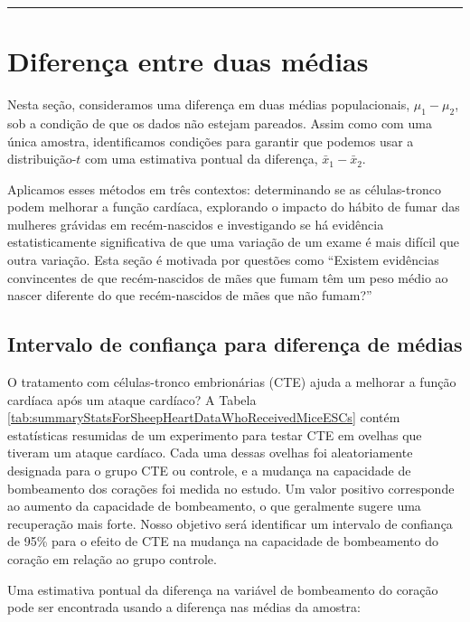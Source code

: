 \documentclass[
]{book}
\theoremstyle{definition}
\theoremstyle{definition}
\theoremstyle{definition}
\theoremstyle{definition}
\theoremstyle{remark}
\begin{document}
\begin{center}\rule{0.5\linewidth}{0.5pt}\end{center}

\hypertarget{differenceTwoMeans}{%
\section{Diferença entre duas médias}\label{differenceTwoMeans}}

Nesta seção, consideramos uma diferença em duas médias populacionais, \(\mu_1 - \mu_2\), sob a condição de que os dados não estejam pareados. Assim como com uma única amostra, identificamos condições para garantir que podemos usar a distribuição-\(t\) com uma estimativa pontual da diferença, \(\bar{x}_1 - \bar{x}_2\).

Aplicamos esses métodos em três contextos: determinando se as células-tronco podem melhorar a função cardíaca, explorando o impacto do hábito de fumar das mulheres grávidas em recém-nascidos e investigando se há evidência estatisticamente significativa de que uma variação de um exame é mais difícil que outra variação. Esta seção é motivada por questões como ``Existem evidências convincentes de que recém-nascidos de mães que fumam têm um peso médio ao nascer diferente do que recém-nascidos de mães que não fumam?''

\hypertarget{confidenceIntervalsMeanDifference}{%
\subsection{Intervalo de confiança para diferença de médias}\label{confidenceIntervalsMeanDifference}}

O tratamento com células-tronco embrionárias (CTE) ajuda a melhorar a função cardíaca após um ataque cardíaco? A Tabela \ref{tab:summaryStatsForSheepHeartDataWhoReceivedMiceESCs} contém estatísticas resumidas de um experimento para testar CTE em ovelhas que tiveram um ataque cardíaco. Cada uma dessas ovelhas foi aleatoriamente designada para o grupo CTE ou controle, e a mudança na capacidade de bombeamento dos corações foi medida no estudo. Um valor positivo corresponde ao aumento da capacidade de bombeamento, o que geralmente sugere uma recuperação mais forte. Nosso objetivo será identificar um intervalo de confiança de 95\% para o efeito de CTE na mudança na capacidade de bombeamento do coração em relação ao grupo controle.

Uma estimativa pontual da diferença na variável de bombeamento do coração pode ser encontrada usando a diferença nas médias da amostra:
\end{document}
